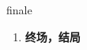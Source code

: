 
\begin{frame}
{\huge finale}
\begin{center}
\begin{enumerate}\Large
  \item \textbf{终场，结局}
\end{enumerate}
\end{center}
\end{frame}
